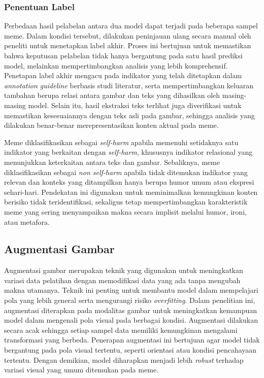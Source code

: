 \subsubsection{Penentuan Label} \label{subsubsec:penentuan_label}
Perbedaan hasil pelabelan antara dua model dapat terjadi pada beberapa sampel meme. Dalam kondisi tersebut, dilakukan peninjauan ulang secara manual oleh peneliti untuk menetapkan label akhir. Proses ini bertujuan untuk memastikan bahwa keputusan pelabelan tidak hanya bergantung pada satu hasil prediksi model, melainkan mempertimbangkan analisis yang lebih komprehensif. Penetapan label akhir mengacu pada indikator yang telah ditetapkan dalam \textit{annotation guideline} berbasis studi literatur, serta mempertimbangkan keluaran tambahan berupa relasi antara gambar dan teks yang dihasilkan oleh masing-masing model. Selain itu, hasil ekstraksi teks terlihat juga diverifikasi untuk memastikan kesesuaiannya dengan teks asli pada gambar, sehingga analisis yang dilakukan benar-benar merepresentasikan konten aktual pada meme.

Meme diklasifikasikan sebagai \textit{self-harm} apabila memenuhi setidaknya satu indikator yang berkaitan dengan \textit{self-harm}, khususnya indikator relasional yang menunjukkan keterkaitan antara teks dan gambar. Sebaliknya, meme diklasifikasikan sebagai \textit{non self-harm} apabila tidak ditemukan indikator yang relevan dan konteks yang ditampilkan hanya berupa humor umum atau ekspresi sehari-hari. Pendekatan ini digunakan untuk meminimalkan kemungkinan konten berisiko tidak teridentifikasi, sekaligus tetap mempertimbangkan karakteristik meme yang sering menyampaikan makna secara implisit melalui humor, ironi, atau metafora.


\subsection{Augmentasi Gambar} \label{subsubsec:augmentasi_gambar}
Augmentasi gambar merupakan teknik yang digunakan untuk meningkatkan variasi data pelatihan dengan memodifikasi data yang ada tanpa mengubah makna utamanya. Teknik ini penting untuk membantu model dalam mempelajari pola yang lebih general serta mengurangi risiko \textit{overfitting}. Dalam penelitian ini, augmentasi diterapkan pada modalitas gambar untuk meningkatkan kemampuan model dalam mengenali pola visual pada berbagai kondisi. Augmentasi dilakukan secara acak sehingga setiap sampel data memiliki kemungkinan mengalami transformasi yang berbeda. Penerapan augmentasi ini bertujuan agar model tidak bergantung pada pola visual tertentu, seperti orientasi atau kondisi pencahayaan tertentu. Dengan demikian, model diharapkan menjadi lebih \textit{robust} terhadap variasi visual yang umum ditemukan pada meme.

